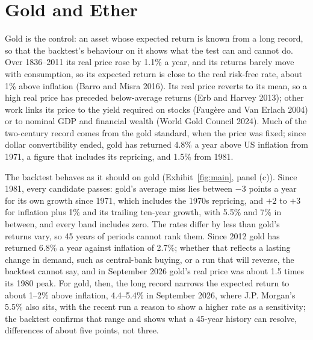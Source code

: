 \documentclass[12pt]{article}
\theoremstyle{plain}
\theoremstyle{remark}
\begin{document}
\section{Gold and Ether}\label{sec:gold}

Gold is the control: an asset whose expected return is known from a long record, so that the backtest's behaviour on it shows what the test can and cannot do. Over 1836--2011 its real price rose by 1.1\% a year, and its returns barely move with consumption, so its expected return is close to the real risk-free rate, about 1\% above inflation (Barro and Misra 2016). Its real price reverts to its mean, so a high real price has preceded below-average returns (Erb and Harvey 2013); other work links its price to the yield required on stocks (Faug\`{e}re and Van Erlach 2004) or to nominal GDP and financial wealth (World Gold Council 2024). Much of the two-century record comes from the gold standard, when the price was fixed; since dollar convertibility ended, gold has returned 4.8\% a year above US inflation from 1971, a figure that includes its repricing, and 1.5\% from 1981.

The backtest behaves as it should on gold (Exhibit~\ref{fig:main}, panel (c)). Since 1981, every candidate passes: gold's average miss lies between $-3$ points a year for its own growth since 1971, which includes the 1970s repricing, and $+2$ to $+3$ for inflation plus 1\% and its trailing ten-year growth, with 5.5\% and 7\% in between, and every band includes zero. The rates differ by less than gold's returns vary, so 45 years of periods cannot rank them. Since 2012 gold has returned 6.8\% a year against inflation of 2.7\%; whether that reflects a lasting change in demand, such as central-bank buying, or a run that will reverse, the backtest cannot say, and in September 2026 gold's real price was about 1.5 times its 1980 peak. For gold, then, the long record narrows the expected return to about 1--2\% above inflation, 4.4--5.4\% in September 2026, where J.P. Morgan's 5.5\% also sits, with the recent run a reason to show a higher rate as a sensitivity; the backtest confirms that range and shows what a 45-year history can resolve, differences of about five points, not three.
\end{document}
